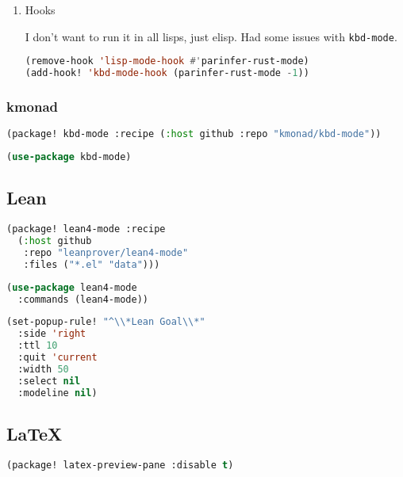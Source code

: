\documentclass[11pt]{article}
\begin{document}
\begin{enumerate}
  \item Hooks
  \label{sec:hooks}

  I don’t want to run it in all lisps, just elisp. Had some issues with \lstinline|kbd-mode|.

\begin{lstlisting}[language=Lisp]
(remove-hook 'lisp-mode-hook #'parinfer-rust-mode)
(add-hook! 'kbd-mode-hook (parinfer-rust-mode -1))
\end{lstlisting}
\end{enumerate}

\subsubsection{kmonad}
\label{sec:kmonad}
\begin{lstlisting}[language=Lisp]
(package! kbd-mode :recipe (:host github :repo "kmonad/kbd-mode"))
\end{lstlisting}

\begin{lstlisting}[language=Lisp]
(use-package kbd-mode)
\end{lstlisting}


\subsection{Lean}
\label{sec:lean}
\begin{lstlisting}[language=Lisp]
(package! lean4-mode :recipe
  (:host github
   :repo "leanprover/lean4-mode"
   :files ("*.el" "data")))
\end{lstlisting}

\begin{lstlisting}[language=Lisp]
(use-package lean4-mode
  :commands (lean4-mode))
\end{lstlisting}

\begin{lstlisting}[language=Lisp]
(set-popup-rule! "^\\*Lean Goal\\*"
  :side 'right
  :ttl 10
  :quit 'current
  :width 50
  :select nil
  :modeline nil)
\end{lstlisting}

\subsection{LaTeX}
\label{sec:latex}
\begin{lstlisting}[language=Lisp]
(package! latex-preview-pane :disable t)
\end{lstlisting}
\end{document}
